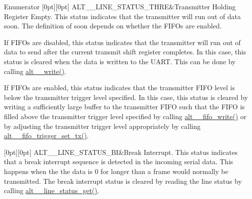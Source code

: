 \begin{DoxyEnumFields}{Enumerator}
[0pt][0pt]{}\mbox{\label{group__UART__LINE_gga9bd71509496adb0f07549c10d42ff745a9d3cf11aaf20212422e33751c022675e}} 
A\+L\+T\+\_\+\_\+\+L\+I\+N\+E\+\_\+\+S\+T\+A\+T\+U\+S\+\_\+\+T\+H\+RE&Transmitter Holding Register Empty. This status indicates that the transmitter will run out of data soon. The definition of soon depends on whether the F\+I\+F\+Os are enabled.

If F\+I\+F\+Os are disabled, this status indicates that the transmitter will run out of data to send after the current transmit shift register completes. In this case, this status is cleared when the data is written to the U\+A\+RT. This can be done by calling \mbox{\hyperlink{group__UART__BASIC_gac16e07d06c432803c734854ab9789dcd}{alt\+\_\+\_\+write()}}.

If F\+I\+F\+Os are enabled, this status indicates that the transmitter F\+I\+FO level is below the transmitter trigger level specified. In this case, this status is cleared by writing a sufficiently large buffer to the transmitter F\+I\+FO such that the F\+I\+FO is filled above the transmitter trigger level specified by calling \mbox{\hyperlink{group__UART__FIFO_ga8d30fc6d9735e51d61c10a5ff86c416e}{alt\+\_\+\_\+fifo\+\_\+write()}} or by adjusting the transmitter trigger level appropriately by calling \mbox{\hyperlink{group__UART__FIFO_ga04495be392cdd03da90dc3480bb50927}{alt\+\_\+\_\+fifo\+\_\+trigger\+\_\+set\+\_\+tx()}}. \\
\hline

[0pt][0pt]{}\mbox{\label{group__UART__LINE_gga9bd71509496adb0f07549c10d42ff745ab49fb93351da7987b91b7273ece39e63}} 
A\+L\+T\+\_\+\_\+\+L\+I\+N\+E\+\_\+\+S\+T\+A\+T\+U\+S\+\_\+\+BI&Break Interrupt. This status indicates that a break interrupt sequence is detected in the incoming serial data. This happens when the the data is 0 for longer than a frame would normally be transmitted. The break interrupt status is cleared by reading the line status by calling \mbox{\hyperlink{group__UART__LINE_gae108dc72c29861f56514d4204d52c0ed}{alt\+\_\+\_\+line\+\_\+status\+\_\+get()}}.


\end{DoxyEnumFields}
